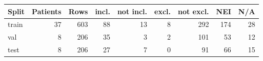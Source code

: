 \begin{tabular}{lrrrrrrrr}
\toprule
Split & Patients & Rows & incl. & not incl. & excl. & not excl. & NEI & N/A \\
\midrule
train & 37 & 603 & 88 & 13 & 8 & 292 & 174 & 28 \\
val & 8 & 206 & 35 & 3 & 2 & 101 & 53 & 12 \\
test & 8 & 206 & 27 & 7 & 0 & 91 & 66 & 15 \\
\bottomrule
\end{tabular}
